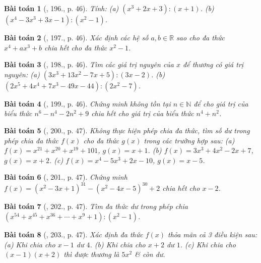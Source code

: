 \documentclass{article}
\newtheorem{baitoan}{Bài toán}
\begin{document}
\begin{baitoan}[\cite{Tuyen_Toan_7}, 196., p. 46]
	Tính: (a) $(x^3 + 2x + 3):(x + 1)$. (b) $(x^4 - 3x^3 + 3x - 1):(x^2 - 1)$.
\end{baitoan}

\begin{baitoan}[\cite{Tuyen_Toan_7}, 197., p. 46]
	Xác định các hệ số $a,b\in\mathbb{R}$ sao cho đa thức $x^4 + ax^3 + b$ chia hết cho đa thức $x^2 - 1$.
\end{baitoan}

\begin{baitoan}[\cite{Tuyen_Toan_7}, 198., p. 46]
	Tìm các giá trị nguyên của $x$ để thương có giá trị nguyên: (a) $(3x^3 + 13x^2 - 7x + 5):(3x - 2)$. (b) $(2x^5 + 4x^4 + 7x^3 - 49x - 44):(2x^2 - 7)$.
\end{baitoan}

\begin{baitoan}[\cite{Tuyen_Toan_7}, 199., p. 46]
	Chứng minh không tồn tại $n\in\mathbb{N}$ để cho giá trị của biểu thức $n^6 - n^4 - 2n^2 + 9$ chia hết cho giá trị của biểu thức $n^4 + n^2$.
\end{baitoan}

\begin{baitoan}[\cite{Tuyen_Toan_7}, 200., p. 47]
	Không thực hiện phép chia đa thức, tìm số dư trong phép chia đa thức $f(x)$ cho đa thức $g(x)$ trong các trường hợp sau: (a) $f(x) = x^{21} + x^{20} + x^{19} + 101$, $g(x) = x + 1$. (b) $f(x) = 3x^3 + 4x^2 - 2x + 7$, $g(x) = x + 2$. (c) $f(x) = x^4 - 5x^3 + 2x - 10$, $g(x) = x - 5$.
\end{baitoan}

\begin{baitoan}[\cite{Tuyen_Toan_7}, 201., p. 47]
	Chứng minh $f(x) = (x^2 - 3x + 1)^{31} - (x^2 - 4x - 5)^{30} + 2$ chia hết cho $x - 2$.
\end{baitoan}

\begin{baitoan}[\cite{Tuyen_Toan_7}, 202., p. 47]
	Tìm đa thức dư trong phép chia $(x^{54} + x^{45} + x^{36} + \cdots + x^9 + 1):(x^2 - 1)$.
\end{baitoan}

\begin{baitoan}[\cite{Tuyen_Toan_7}, 203., p. 47]
	Xác định đa thức $f(x)$ thỏa mãn cả 3 điều kiện sau: (a) Khi chia cho $x - 1$ dư $4$. (b) Khi chia cho $x + 2$ dư $1$. (c) Khi chia cho $(x - 1)(x + 2)$ thì được thương là $5x^2$ \& còn dư.
\end{baitoan}
\end{document}
